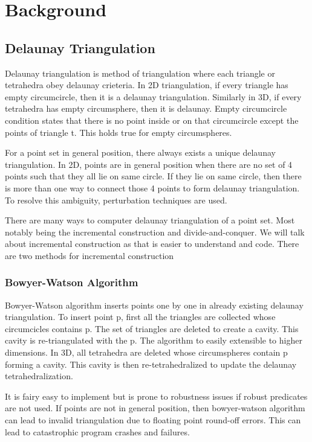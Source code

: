 \chapter{Background}
\section{Delaunay Triangulation}
Delaunay triangulation is method of triangulation where each triangle or tetrahedra obey delaunay crieteria. In 2D triangulation, if every triangle has empty circumcircle, then it is a delaunay triangulation. Similarly in 3D, if every tetrahedra has empty circumsphere, then it is delaunay. Empty circumcircle condition states that there is no point inside or on that circumcircle except the points of triangle t. This holds true for empty circumspheres.

For a point set in general position, there always exists a unique delaunay triangulation. In 2D, points are in general position when there are no set of 4 points such that they all lie on same circle. If they lie on same circle, then there is more than one way to connect those 4 points to form delaunay triangulation. To resolve this ambiguity, perturbation techniques are used.

There are many ways to computer delaunay triangulation of a point set. Most notably being the incremental construction and divide-and-conquer. We will talk about incremental construction as that is easier to understand and code. There are two methods for incremental construction

\subsection{Bowyer-Watson Algorithm}
Bowyer-Watson algorithm inserts points one by one in already existing delaunay triangulation. To insert point p, first all the triangles are collected whose circumcicles contains p. The set of triangles are deleted to create a cavity. This cavity is re-triangulated with the p. The algorithm to easily extensible to higher dimensions. In 3D, all tetrahedra are deleted whose circumspheres contain p forming a cavity. This cavity is then re-tetrahedralized to update the delaunay tetrahedralization. 

It is fairy easy to implement but is prone to robustness issues if robust predicates are not used. If points are not in general position, then bowyer-watson algorithm can lead to invalid triangulation due to floating point round-off errors. This can lead to catastrophic program crashes and failures.

